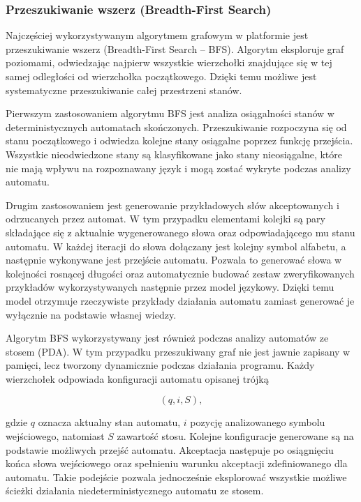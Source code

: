 \documentclass[12pt]{article}
\begin{document}
\subsubsection{Przeszukiwanie wszerz (Breadth-First Search)}

Najczęściej wykorzystywanym algorytmem grafowym w platformie jest przeszukiwanie wszerz (Breadth-First Search -- BFS). Algorytm eksploruje graf poziomami, odwiedzając najpierw wszystkie wierzchołki znajdujące się w tej samej odległości od wierzchołka początkowego. Dzięki temu możliwe jest systematyczne przeszukiwanie całej przestrzeni stanów.

Pierwszym zastosowaniem algorytmu BFS jest analiza osiągalności stanów w deterministycznych automatach skończonych. Przeszukiwanie rozpoczyna się od stanu początkowego i odwiedza kolejne stany osiągalne poprzez funkcję przejścia. Wszystkie nieodwiedzone stany są klasyfikowane jako stany nieosiągalne, które nie mają wpływu na rozpoznawany język i mogą zostać wykryte podczas analizy automatu.

Drugim zastosowaniem jest generowanie przykładowych słów akceptowanych i odrzucanych przez automat. W tym przypadku elementami kolejki są pary składające się z aktualnie wygenerowanego słowa oraz odpowiadającego mu stanu automatu. W każdej iteracji do słowa dołączany jest kolejny symbol alfabetu, a następnie wykonywane jest przejście automatu. Pozwala to generować słowa w kolejności rosnącej długości oraz automatycznie budować zestaw zweryfikowanych przykładów wykorzystywanych następnie przez model językowy. Dzięki temu model otrzymuje rzeczywiste przykłady działania automatu zamiast generować je wyłącznie na podstawie własnej wiedzy.

Algorytm BFS wykorzystywany jest również podczas analizy automatów ze stosem (PDA). W tym przypadku przeszukiwany graf nie jest jawnie zapisany w pamięci, lecz tworzony dynamicznie podczas działania programu. Każdy wierzchołek odpowiada konfiguracji automatu opisanej trójką

\begin{equation}
(q,i,S),
\end{equation}

gdzie $q$ oznacza aktualny stan automatu, $i$ pozycję analizowanego symbolu wejściowego, natomiast $S$ zawartość stosu. Kolejne konfiguracje generowane są na podstawie możliwych przejść automatu. Akceptacja następuje po osiągnięciu końca słowa wejściowego oraz spełnieniu warunku akceptacji zdefiniowanego dla automatu. Takie podejście pozwala jednocześnie eksplorować wszystkie możliwe ścieżki działania niedeterministycznego automatu ze stosem.
\end{document}
